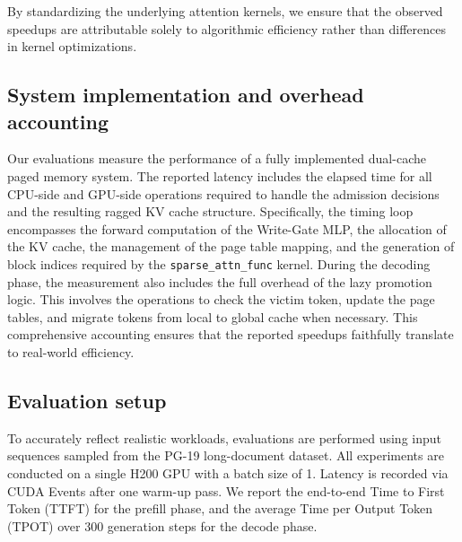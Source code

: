 \myParagraphWithoutTitle By standardizing the underlying attention kernels, we ensure that the observed speedups are attributable solely to algorithmic efficiency rather than differences in kernel optimizations.

\subsection{System implementation and overhead accounting}
Our evaluations measure the performance of a fully implemented dual-cache paged memory system. The reported latency includes the elapsed time for all CPU-side and GPU-side operations required to handle the admission decisions and the resulting ragged KV cache structure. Specifically, the timing loop encompasses the forward computation of the Write-Gate MLP, the allocation of the KV cache, the management of the page table mapping, and the generation of block indices required by the \texttt{sparse\_attn\_func} kernel. During the decoding phase, the measurement also includes the full overhead of the lazy promotion logic. This involves the operations to check the victim token, update the page tables, and migrate tokens from local to global cache when necessary. This comprehensive accounting ensures that the reported speedups faithfully translate to real-world efficiency.

\subsection{Evaluation setup}
To accurately reflect realistic workloads, evaluations are performed using input sequences sampled from the PG-19 \cite{pg19} long-document dataset. All experiments are conducted on a single H200 GPU with a batch size of 1. Latency is recorded via CUDA Events after one warm-up pass. We report the end-to-end Time to First Token (TTFT) for the prefill phase, and the average Time per Output Token (TPOT) over 300 generation steps for the decode phase.